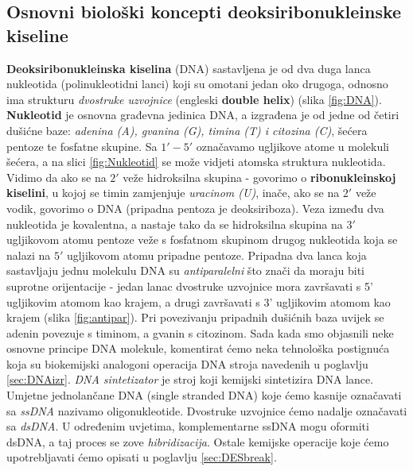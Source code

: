 \documentclass[a4paper,oneside,12pt]{memoir} %
\begin{document}
\begin{spacing}{1.5}
\section{Osnovni biološki koncepti deoksiribonukleinske kiseline}
\label{sec:DNA}
\textbf{Deoksiribonukleinska kiselina} (DNA) sastavljena je od dva duga lanca nukleotida (polinukleotidni lanci) koji su omotani jedan oko drugoga, odnosno ima strukturu \textit{dvostruke uzvojnice }(engleski \textbf{double helix}) (slika \ref{fig:DNA}). \textbf{Nukleotid} je osnovna građevna jedinica DNA, a izgrađena je od jedne od četiri dušićne baze: \textit{adenina (A), gvanina (G), timina (T) i citozina (C)}, šećera pentoze te fosfatne skupine. Sa $1' - 5'$ označavamo ugljikove atome u molekuli šećera, a na slici \ref{fig:Nukleotid} se može vidjeti atomska struktura nukleotida. Vidimo da ako se na $2'$ veže hidroksilna skupina - govorimo o \textbf{ribonukleinskoj kiselini}, u kojoj se timin zamjenjuje \textit{uracinom (U)}, inače, ako se na $2'$ veže vodik, govorimo o DNA (pripadna pentoza je deoksiriboza). Veza između dva nukleotida je kovalentna, a nastaje tako da se hidroksilna skupina na $3'$ ugljikovom atomu pentoze veže s fosfatnom skupinom drugog nukleotida koja se nalazi na $5'$ ugljikovom atomu pripadne pentoze. Pripadna dva lanca koja sastavljaju jednu molekulu DNA su \textit{antiparalelni} što znači da moraju biti suprotne orijentacije - jedan lanac dvostruke uzvojnice mora završavati s 5' ugljikovim atomom kao krajem, a drugi završavati s 3' ugljikovim atomom kao krajem (slika \ref{fig:antipar}). Pri povezivanju pripadnih dušićnih baza uvijek se adenin povezuje s timinom, a gvanin s citozinom. Sada kada smo objasnili neke osnovne principe DNA molekule, komentirat ćemo neka tehnološka postignuća koja su biokemijski analogoni operacija DNA stroja navedenih u poglavlju \ref{sec:DNAizr}.
\textit{DNA sintetizator} je stroj koji kemijski sintetizira DNA lance. Umjetne jednolančane DNA (single stranded DNA) koje ćemo kasnije označavati sa \textit{ssDNA} nazivamo oligonukleotide. Dvostruke uzvojnice ćemo nadalje označavati sa \textit{dsDNA}. U određenim uvjetima, komplementarne ssDNA mogu oformiti dsDNA, a taj proces se zove \textit{hibridizacija}. Ostale kemijske operacije koje ćemo upotrebljavati ćemo opisati u poglavlju \ref{sec:DESbreak}.


\end{spacing}
\end{document}

